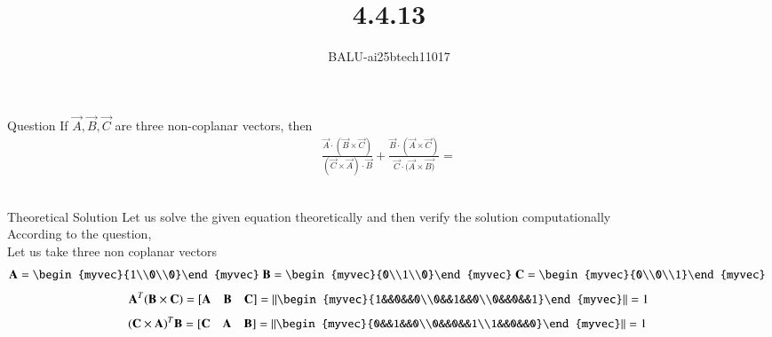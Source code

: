 \documentclass{beamer}
\title %
{4.4.13}
\author %
{BALU-ai25btech11017}
\begin{document}
\frame{\titlepage}
\begin{frame}{Question}
 If $\vec{A}, \vec{B}, \vec{C}$ are three non-coplanar vectors, then
\begin{align}
\frac{\vec{A} \cdot(\vec{B}\times\vec{C})}{(\vec{C} \times \vec{A}) \cdot \vec{B}}
+ \frac{\vec{B} \cdot(\vec{A}\times \vec{C})}{\vec{C} \cdot (\vec{A} \times \vec{B)}}
= 
\end{align}\\ 
\end{frame}
\begin{frame}{Theoretical Solution}
Let us solve the given equation theoretically and then verify the solution computationally \\
According to the question, \\
Let us take three non coplanar vectors \\
\begin{align}
\vec{A}=\begin{myvec}{1\\0\\0}\end{myvec}\
\vec{B}=\begin{myvec}{0\\1\\0}\end{myvec}\
\vec{C}=\begin{myvec}{0\\0\\1}\end{myvec}\
\end{align}
\begin{align}
\vec{A}^T(\vec{B}\times\vec{C})=[\vec{A}\quad\vec{B}\quad\vec{C}]=
\left\|\begin{myvec}{1&&0&&0\\0&&1&&0\\0&&0&&1}\end{myvec}\right\|=1
\end{align}
\begin{align}
(\vec{C} \times \vec{A})^T\vec{B}=[\vec{C}\quad\vec{A}\quad\vec{B}]=\left\|\begin{myvec}{0&&1&&0\\0&&0&&1\\1&&0&&0}\end{myvec}\right\|=1\
\end{align}

\end{frame}
\end{document}
